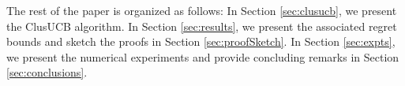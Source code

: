 	
The rest of the paper is organized as follows: In Section \ref{sec:clusucb}, we present the ClusUCB algorithm. In Section \ref{sec:results}, we present the associated regret bounds and sketch the proofs in Section \ref{sec:proofSketch}. In Section \ref{sec:expts}, we present the numerical experiments and provide concluding remarks in Section \ref{sec:conclusions}. 
